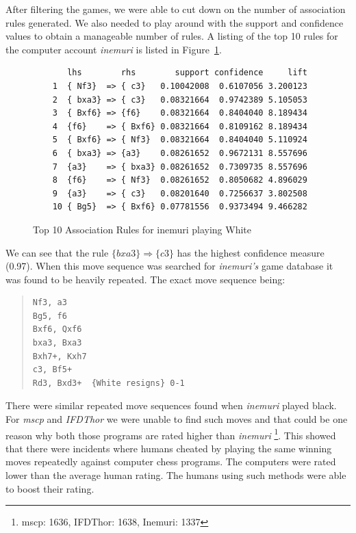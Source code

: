 \documentclass{article}
\begin{document}
After filtering the games, we were able to cut down on the number of association rules generated. We also needed to play around with the support and confidence values to obtain a manageable number of rules. A listing of the top 10 rules for the computer account {\sl inemuri} is listed in Figure~\ref{fig:inemuriwhite}.

\begin{figure}[htp]
\begin{verbatim}
       lhs        rhs        support confidence     lift
    1  { Nf3}  => { c3}   0.10042008  0.6107056 3.200123
    2  { bxa3} => { c3}   0.08321664  0.9742389 5.105053
    3  { Bxf6} => {f6}    0.08321664  0.8404040 8.189434
    4  {f6}    => { Bxf6} 0.08321664  0.8109162 8.189434
    5  { Bxf6} => { Nf3}  0.08321664  0.8404040 5.110924
    6  { bxa3} => {a3}    0.08261652  0.9672131 8.557696
    7  {a3}    => { bxa3} 0.08261652  0.7309735 8.557696
    8  {f6}    => { Nf3}  0.08261652  0.8050682 4.896029
    9  {a3}    => { c3}   0.08201640  0.7256637 3.802508
    10 { Bg5}  => { Bxf6} 0.07781556  0.9373494 9.466282
\end{verbatim}

\caption{Top 10 Association Rules for inemuri playing White}
\label{fig:inemuriwhite}
\end{figure}

We can see that the rule $\{bxa3\} \Rightarrow \{c3\}$ has the highest confidence measure (0.97). When this move sequence was searched for {\sl inemuri's} game database it was found to be heavily repeated. The exact move sequence being:

\begin{quote}
\begin{verbatim}
Nf3, a3 
Bg5, f6
Bxf6, Qxf6
bxa3, Bxa3
Bxh7+, Kxh7
c3, Bf5+
Rd3, Bxd3+  {White resigns} 0-1
\end{verbatim}
\end{quote}

There were similar repeated move sequences found when {\sl inemuri} played black. For {\sl mscp} and {\sl IFDThor} we were unable to find such moves and that could be one reason why both those programs are rated higher than {\sl inemuri} \footnote{mscp: 1636, IFDThor: 1638, Inemuri: 1337}. This showed that there were incidents where humans cheated by playing the same winning moves repeatedly against computer chess programs. The computers were rated lower than the average human rating. The humans using such methods were able to boost their rating.
\end{document}
